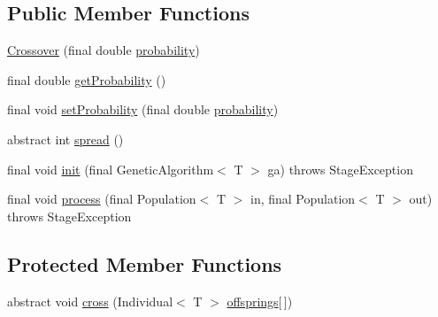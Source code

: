 \subsection*{Public Member Functions}
\begin{DoxyCompactItemize}
\item 
\hyperlink{classjenes_1_1stage_1_1operator_1_1_crossover_3_01_t_01extends_01_chromosome_01_4_a2287f5646b08b9c3167934ee620f2d6e}{Crossover} (final double \hyperlink{classjenes_1_1stage_1_1operator_1_1_crossover_3_01_t_01extends_01_chromosome_01_4_a2b4aec7312a223ba84862f7848b14542}{probability})
\item 
final double \hyperlink{classjenes_1_1stage_1_1operator_1_1_crossover_3_01_t_01extends_01_chromosome_01_4_a86b60220061c4bf1f0eaae66d22f5eb8}{get\-Probability} ()
\item 
final void \hyperlink{classjenes_1_1stage_1_1operator_1_1_crossover_3_01_t_01extends_01_chromosome_01_4_ac491f1c3b3b8c074f3b59bc33f65f389}{set\-Probability} (final double \hyperlink{classjenes_1_1stage_1_1operator_1_1_crossover_3_01_t_01extends_01_chromosome_01_4_a2b4aec7312a223ba84862f7848b14542}{probability})
\item 
abstract int \hyperlink{classjenes_1_1stage_1_1operator_1_1_crossover_3_01_t_01extends_01_chromosome_01_4_a8bb995f2cf77073b79c9276ee3e8535d}{spread} ()
\item 
final void \hyperlink{classjenes_1_1stage_1_1operator_1_1_crossover_3_01_t_01extends_01_chromosome_01_4_ac0b5d0219d2938f7756e616d04039ae0}{init} (final Genetic\-Algorithm$<$ T $>$ ga)  throws Stage\-Exception 
\item 
final void \hyperlink{classjenes_1_1stage_1_1operator_1_1_crossover_3_01_t_01extends_01_chromosome_01_4_ac14c88e86762023813c69bee4c31d7ea}{process} (final Population$<$ T $>$ in, final Population$<$ T $>$ out)  throws Stage\-Exception 
\end{DoxyCompactItemize}
\subsection*{Protected Member Functions}
\begin{DoxyCompactItemize}
\item 
abstract void \hyperlink{classjenes_1_1stage_1_1operator_1_1_crossover_3_01_t_01extends_01_chromosome_01_4_ac47e22fb5a73617bde7a1131da5be161}{cross} (Individual$<$ T $>$ \hyperlink{classjenes_1_1stage_1_1operator_1_1_crossover_3_01_t_01extends_01_chromosome_01_4_ac25f80174c265f930c316c2fb4bc7c5c}{offsprings}\mbox{[}$\,$\mbox{]})
\end{DoxyCompactItemize}
